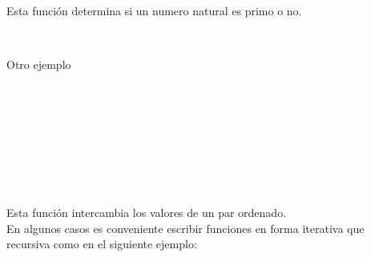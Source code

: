       Esta función determina si un numero natural es primo o no.
      
      \begin{fxcode}
         \\
      \end{fxcode}
      
      Otro ejemplo
      
      \begin{fxcode}
         \\
         \\
         \\
         \\
         \\
         \\
         \\
      \end{fxcode}
      
      Esta función intercambia los valores de un par ordenado.
      \\
      
      En algunos casos es conveniente escribir funciones en forma iterativa que recursiva como en el siguiente ejemplo:
      
      \begin{fxcode}
         \\
         \\
         \\
         \\
         \\
         \\
         \\
         \\
         \\
         \\
         \\
         \\
         \\
         \\
      \end{fxcode}
      
